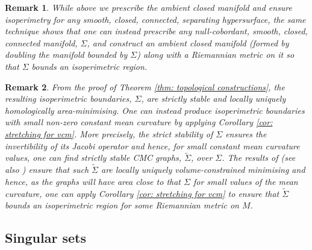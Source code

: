 \documentclass[12pt]{article}
\newtheorem{remark}{Remark}
\begin{document}
\begin{remark}
    While above we prescribe the ambient closed manifold and ensure isoperimetry for any smooth, closed, connected, separating hypersurface, the same technique shows that one can instead prescribe any null-cobordant, smooth, closed, connected manifold, $\Sigma$, and construct an ambient closed manifold (formed by doubling the manifold bounded by $\Sigma$) along with a Riemannian metric on it so that $\Sigma$ bounds an isoperimetric region.
\end{remark}

\begin{remark}
    From the proof of Theorem \ref{thm: topological constructions}, the resulting isoperimetric boundaries, $\Sigma$, are strictly stable and locally uniquely homologically area-minimising. One can instead produce isoperimetric boundaries with small non-zero constant mean curvature by applying Corollary \ref{cor: stretching for vcm}. More precisely, the strict stability of $\Sigma$ ensures the invertibility of its Jacobi operator and hence, for small constant mean curvature values, one can find strictly stable CMC graphs, $\widetilde{\Sigma}$, over $\Sigma$. The results of \cite{W94} (see also \cite{G96}) ensure that such $\widetilde{\Sigma}$ are locally uniquely volume-constrained minimising and hence, as the graphs will have area close to that $\Sigma$ for small values of the mean curvature, one can apply Corollary \ref{cor: stretching for vcm} to ensure that $\widetilde{\Sigma}$ bounds an isoperimetric region for some Riemannian metric on $M$.
\end{remark}


\subsection{Singular sets}\label{subsec: singular sets}
\end{document}
